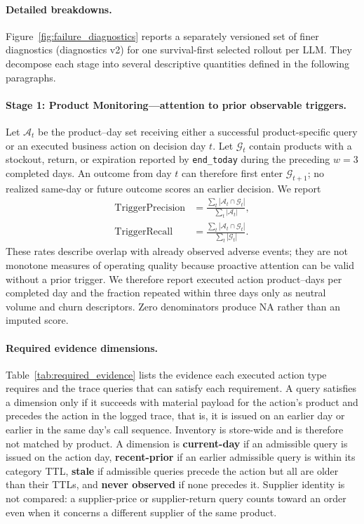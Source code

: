 \paragraph{Detailed breakdowns.}
Figure~\ref{fig:failure_diagnostics} reports a separately versioned set of finer diagnostics (diagnostics v2) for one survival-first selected rollout per LLM. They decompose each stage into several descriptive quantities defined in the following paragraphs.

\paragraph{Stage 1: Product Monitoring---attention to prior observable triggers.}
Let $\mathcal{A}_t$ be the product--day set receiving either a successful product-specific query or an executed business action on decision day $t$. Let $\mathcal{G}_t$ contain products with a stockout, return, or expiration reported by \texttt{end\_today} during the preceding $w=3$ completed days. An outcome from day $t$ can therefore first enter $\mathcal{G}_{t+1}$; no realized same-day or future outcome scores an earlier decision. We report
\begin{equation}
\begin{aligned}
\mathrm{TriggerPrecision}
&=\frac{\sum_t|\mathcal{A}_t\cap\mathcal{G}_t|}{\sum_t|\mathcal{A}_t|},\\
\mathrm{TriggerRecall}
&=\frac{\sum_t|\mathcal{A}_t\cap\mathcal{G}_t|}{\sum_t|\mathcal{G}_t|}.
\end{aligned}
\end{equation}
These rates describe overlap with already observed adverse events; they are not monotone measures of operating quality because proactive attention can be valid without a prior trigger. We therefore report executed action product--days per completed day and the fraction repeated within three days only as neutral volume and churn descriptors. Zero denominators produce NA rather than an imputed score.

\paragraph{Required evidence dimensions.}
Table~\ref{tab:required_evidence} lists the evidence each executed action type requires and the trace queries that can satisfy each requirement. A query satisfies a dimension only if it succeeds with material payload for the action's product and precedes the action in the logged trace, that is, it is issued on an earlier day or earlier in the same day's call sequence. Inventory is store-wide and is therefore not matched by product. A dimension is \textbf{current-day} if an admissible query is issued on the action day, \textbf{recent-prior} if an earlier admissible query is within its category TTL, \textbf{stale} if admissible queries precede the action but all are older than their TTLs, and \textbf{never observed} if none precedes it. Supplier identity is not compared: a supplier-price or supplier-return query counts toward an order even when it concerns a different supplier of the same product.

